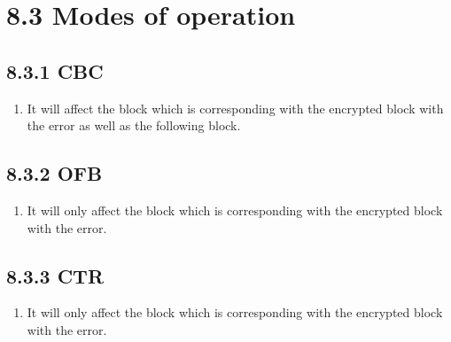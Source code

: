 \documentclass{report}
\begin{document}
	\section*{8.3 Modes of operation}
	\subsection*{8.3.1 CBC}
	\begin{enumerate}[]
		\item It will affect the block which is corresponding with the encrypted block with the error as well as the following block.
	\end{enumerate}
	\subsection*{8.3.2 OFB}
	\begin{enumerate}[]
		\item It will only affect the block which is corresponding with the encrypted block with the error.
	\end{enumerate}
	\subsection*{8.3.3 CTR}
	\begin{enumerate}[]
		\item It will only affect the block which is corresponding with the encrypted block with the error.
	\end{enumerate}
	
\end{document}
